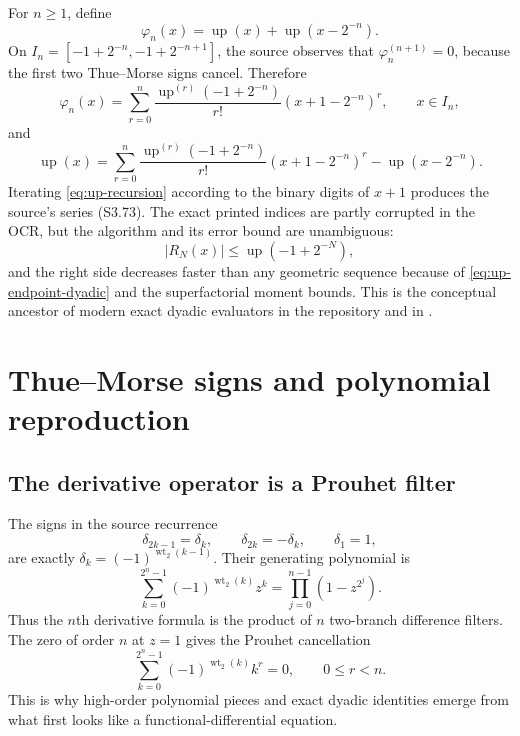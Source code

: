 \documentclass[11pt,oneside]{article}
\theoremstyle{definition}
\theoremstyle{remark}
\newcommand{\Up}{\operatorname{up}}
\newcommand{\wt}{\operatorname{wt}_2}
\begin{document}
For $n\ge1$, define
\begin{equation}
 \varphi_n(x)=\Up(x)+\Up(x-2^{-n}).
 \label{eq:phi-n}
\end{equation}
On
$I_n=[-1+2^{-n},-1+2^{-n+1}]$, the source observes that
$\varphi_n^{(n+1)}=0$, because the first two Thue--Morse signs cancel.  Therefore
\begin{equation}
 \varphi_n(x)=\sum_{r=0}^{n}
 \frac{\Up^{(r)}(-1+2^{-n})}{r!}(x+1-2^{-n})^r,
 \qquad x\in I_n,
 \tag{S3.70}
 \label{eq:phi-polynomial}
\end{equation}
and
\begin{equation}
 \Up(x)=\sum_{r=0}^{n}
 \frac{\Up^{(r)}(-1+2^{-n})}{r!}(x+1-2^{-n})^r
 -\Up(x-2^{-n}).
 \tag{S3.71}
 \label{eq:up-recursion}
\end{equation}
Iterating \eqref{eq:up-recursion} according to the binary digits of $x+1$ produces the
source's series (S3.73).  The exact printed indices are partly corrupted in the OCR, but the
algorithm and its error bound are unambiguous:
\begin{equation}
 |R_N(x)|\le\Up(-1+2^{-N}),
 \label{eq:binary-remainder}
\end{equation}
and the right side decreases faster than any geometric sequence because of
\eqref{eq:up-endpoint-dyadic} and the superfactorial moment bounds.  This is the conceptual
ancestor of modern exact dyadic evaluators in the repository and in \cite{haugland2016}.

\section{Thue--Morse signs and polynomial reproduction}
\label{sec:thue-morse}

\subsection{The derivative operator is a Prouhet filter}

The signs in the source recurrence
\begin{equation}
 \delta_{2k-1}=\delta_k,\qquad \delta_{2k}=-\delta_k,
 \qquad\delta_1=1,
 \label{eq:delta-recursion}
\end{equation}
are exactly
$\delta_k=(-1)^{\wt(k-1)}$.  Their generating polynomial is
\begin{equation}
 \sum_{k=0}^{2^n-1}(-1)^{\wt(k)}z^k
 =\prod_{j=0}^{n-1}(1-z^{2^j}).
 \label{eq:TM-product}
\end{equation}
Thus the $n$th derivative formula is the product of $n$ two-branch difference filters.  The
zero of order $n$ at $z=1$ gives the Prouhet cancellation
\begin{equation}
 \sum_{k=0}^{2^n-1}(-1)^{\wt(k)}k^r=0,
 \qquad 0\le r<n.
 \label{eq:Prouhet}
\end{equation}
This is why high-order polynomial pieces and exact dyadic identities emerge from what first
looks like a functional-differential equation.
\end{document}
